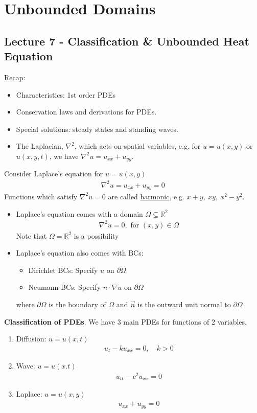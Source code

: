 \documentclass[12pt, letterpaper]{article}
\begin{document}
\section{Unbounded Domains}
\subsection{Lecture 7 - Classification \& Unbounded Heat Equation}
\underline{Recap}:
\begin{itemize}
    \item Characteristics: 1st order PDEs
    \item Conservation laws and derivations for PDEs.
    \item Special solutions: steady states and standing waves.
    \item The Laplacian, $\nabla^2$, which acts on spatial variables, e.g. for $u = u(x,y)$ 
    or $u(x,y,t)$, we have $\nabla^2 u = u_{xx} + u_{yy}$.
\end{itemize}
Consider Laplace's equation for $u = u(x,y)$
\begin{align*}
    \nabla^2 u = u_{xx} + u_{yy} = 0
\end{align*}
Functions which satisfy $\nabla^2 u = 0$ are called \underline{harmonic}, e.g. $x+y,\ xy,\ 
x^2-y^2$. 
\begin{itemize}
    \item Laplace's equation comes with a domain $\Omega \subseteq \mathbb{R}^2$
    \begin{align*}
        \nabla^2 u = 0, \text{ for } (x,y) \in \Omega
    \end{align*}
    Note that $\Omega = \mathbb{R}^2$ is a possibility
    \item Laplace's equation also comes with BCs:
    \begin{itemize}
        \item Dirichlet BCs: Specify $u$ on $\partial \Omega$
        \item Neumann BCs: Specify $n\cdot \nabla u$ on $\partial \Omega$
    \end{itemize}
    where $\partial \Omega$ is the boundary of $\Omega$ and $\vec{n}$ is the outward unit normal 
    to $\partial \Omega$
\end{itemize} 
\textbf{Classification of PDEs}. We have 3 main PDEs for functions of 2 variables.
\begin{enumerate}[1)]
    \item Diffusion: $u = u(x,t)$
    \begin{align*}
        u_t - ku_{xx} = 0,\quad k > 0
    \end{align*}
    \item Wave: $u = u(x.t)$
    \begin{align*}
        u_{tt} - c^2u_{xx} = 0
    \end{align*}
    \item Laplace: $u = u(x,y)$
    \begin{align*}
        u_{xx} + u_{yy} = 0
    \end{align*}
\end{enumerate}
\end{document}
